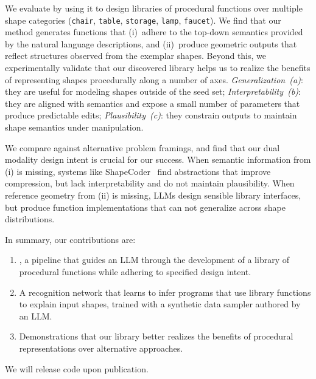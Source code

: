 We evaluate \methodname by using it to design libraries of procedural functions over multiple shape categories (\texttt{chair}, \texttt{table}, \texttt{storage}, \texttt{lamp}, \texttt{faucet}).
We find that our method generates functions that (i)~adhere to the top-down semantics provided by the natural language descriptions, and (ii)~produce geometric outputs that reflect structures observed from the exemplar shapes. 
Beyond this, we experimentally validate that our discovered library helps us to realize the benefits of representing shapes procedurally along a number of axes. 
\textit{Generalization~(a)}: they are useful for modeling shapes outside of the seed set; 
\textit{Interpretability~(b)}: they are aligned with semantics and expose a small number of parameters that produce predictable edits; 
\textit{Plausibility~(c)}: they constrain outputs to maintain shape semantics under manipulation.

We compare against alternative problem framings, and find that our dual modality design intent is crucial for our success.
When semantic information from (i) is missing, systems like ShapeCoder~\cite{jones2023shapecoder} find abstractions that improve compression, but lack interpretability and do not maintain plausibility. 
When reference geometry from (ii) is missing, LLMs design sensible library interfaces, but produce function implementations that can not generalize across shape distributions.

In summary, our contributions are:
 
\begin{enumerate}[(1)]
    \denselist
    \item \methodname, a pipeline that guides an LLM through the development of a library of procedural functions while adhering to specified design intent.
    \item A recognition network that learns to infer programs that use library functions to explain input shapes, trained with a synthetic data sampler authored by an LLM.     
    \item Demonstrations that our library better realizes the benefits of procedural representations over alternative approaches.
\end{enumerate}

We will release code upon publication.